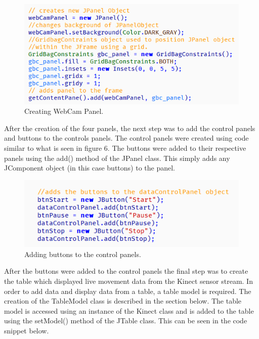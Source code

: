 \documentclass[a4paper, 12pt]{article}
\begin{document}
\begin{figure}[!htb]
	\begin{center}
  \includegraphics[scale=0.7]{codesnippet1.png}
  	\caption{Creating WebCam Panel.}
  \end{center} 
  \label{fig: codesnippet2} 
\end{figure}


After the creation of the four panels, the next step was to add the control panels and buttons to the controls panels. The control panels were created using code similar to what is seen in figure 6. The buttons were added to their respective panels using the add() method of the JPanel class. This simply adds any JComponent object (in this case buttons) to the panel. 


\begin{figure}[!htb]
	\begin{center}
  \includegraphics[scale=0.7]{codesnippet3.png}
  	\caption{Adding buttons to the control panels.}
  \end{center} 
  \label{fig: codesnippet3} 
\end{figure}

After the buttons were added to the control panels the final step was to create the table which displayed live movement data from the Kinect sensor stream. In order to add data and display data from a table, a table model is required. The creation of the TableModel class is described in the section below. The table model is accessed using an instance of the Kinect class and is added to the table using the setModel() method of the JTable class. This can be seen in the code snippet below. 
\end{document}
